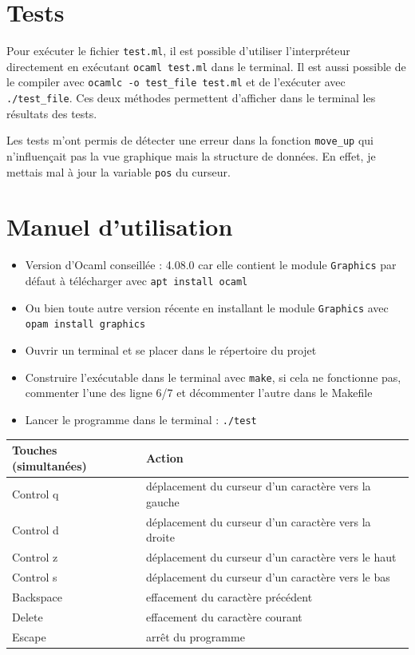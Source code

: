 \documentclass[a4paper,12pt]{article}
\begin{document}
\section{Tests}
Pour exécuter le fichier \texttt{test.ml}, il est possible d'utiliser l'interpréteur directement en exécutant \texttt{ocaml test.ml} dans le terminal. Il est aussi possible de le compiler avec \texttt{ocamlc -o test\_file test.ml} et de l'exécuter avec \texttt{./test\_file}. Ces deux méthodes permettent d'afficher dans le terminal les résultats des tests.

Les tests m'ont permis de détecter une erreur dans la fonction \texttt{move\_up} qui n'influençait pas la vue graphique mais la structure de données. En effet, je mettais mal à jour la variable \texttt{pos} du curseur.

\newpage

\section{Manuel d'utilisation}
\begin {itemize}
    \item Version d'Ocaml conseillée : 4.08.0 car elle contient le module \texttt{Graphics} par défaut à télécharger avec \texttt{apt install ocaml} 
    \item Ou bien toute autre version récente en installant le module \texttt{Graphics} avec \texttt{opam install graphics}
    \item Ouvrir un terminal et se placer dans le répertoire du projet
    \item Construire l'exécutable dans le terminal avec \texttt{make}, si cela ne fonctionne pas, commenter l'une des ligne 6/7 et décommenter l'autre dans le Makefile
    \item Lancer le programme dans le terminal : \texttt{./test}
\end{itemize}

\begin{table}[htbp]
  \centering
  \begin{tabular}{|l|l|}
  \hline
  Touches (simultanées) & Action \\
  \hline
  Control q & déplacement du curseur d'un caractère vers la gauche \\
  \hline
  Control d & déplacement du curseur d'un caractère vers la droite \\
  \hline
  Control z & déplacement du curseur d'un caractère vers le haut \\
  \hline
  Control s & déplacement du curseur d'un caractère vers le bas \\
  \hline
  Backspace & effacement du caractère précédent \\
  \hline
  Delete & effacement du caractère courant \\
  \hline
  Escape & arrêt du programme \\
  \hline
  \end{tabular}
\end{table}
\end{document}
